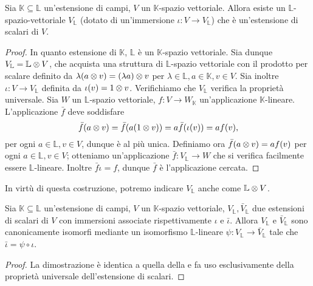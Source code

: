 \begin{proposition}
Sia $\mathbb{K}\subseteq\mathbb{L}$ un'estensione di campi, $V$ un $\mathbb{K}$-spazio vettoriale. Allora esiste un $\mathbb{L}$-spazio-vettoriale $V_\mathbb{L}$ (dotato di un'immersione $\iota:V\to V_\mathbb{L}$) che è un'estensione di scalari di $V$.
\end{proposition}
\begin{proof}
In quanto estensione di $\mathbb{K}$, $\mathbb{L}$ è un $\mathbb{K}$-spazio vettoriale. Sia dunque $V_\mathbb{L}=\mathbb{L}\otimes V$, che acquista una struttura di $\mathbb{L}$-spazio vettoriale con il prodotto per scalare definito da $\lambda(a\otimes v)=(\lambda a)\otimes v$ per $\lambda\in\mathbb{L}\comma a\in\mathbb{K}\comma v\in V$. Sia inoltre $\iota:V\to V_\mathbb{L}$ definita da $\iota(v)=1\otimes v$. Verifichiamo che $V_\mathbb{L}$ verifica la proprietà universale. Sia $W$ un $\mathbb{L}$-spazio vettoriale, $f:V\to W_\mathbb{K}$ un'applicazione $\mathbb{K}$-lineare. L'applicazione $\bar{f}$ deve soddisfare
$$
\bar{f}(a\otimes v)=\bar{f}(a(1\otimes v))=a\bar{f}(\iota(v))=af(v),
$$
per ogni $a\in\mathbb{L}\comma v\in V$, dunque è al più unica. Definiamo ora $\bar{f}(a\otimes v)=af(v)$ per ogni $a\in\mathbb{L}\comma v\in V$; otteniamo un'applicazione $\bar{f}:V_\mathbb{L}\to W$ che si verifica facilmente essere $\mathbb{L}$-lineare. Inoltre $\bar{f}\iota=f$, dunque $\bar{f}$ è l'applicazione cercata.
\end{proof}


In virtù di questa costruzione, potremo indicare $V_\mathbb{L}$ anche come $\mathbb{L}\otimes V$.


\begin{proposition}
Sia $\mathbb{K}\subseteq\mathbb{L}$ un'estensione di campi, $V$ un $\mathbb{K}$-spazio vettoriale, $V_\mathbb{L}\comma \bar{V}_\mathbb{L}$ due estensioni di scalari di $V$ con immersioni associate rispettivamente $\iota$ e $\bar{\iota}$. Allora $V_\mathbb{L}$ e $\bar{V}_\mathbb{L}$ sono canonicamente isomorfi mediante un isomorfismo $\mathbb{L}$-lineare $\psi:V_\mathbb{L}\to \bar{V}_\mathbb{L}$ tale che $\bar{\iota}=\psi\circ\iota$.
\end{proposition}
\begin{proof}
La dimostrazione è identica a quella della  e fa uso esclusivamente della proprietà universale dell'estensione di scalari.
\end{proof}

